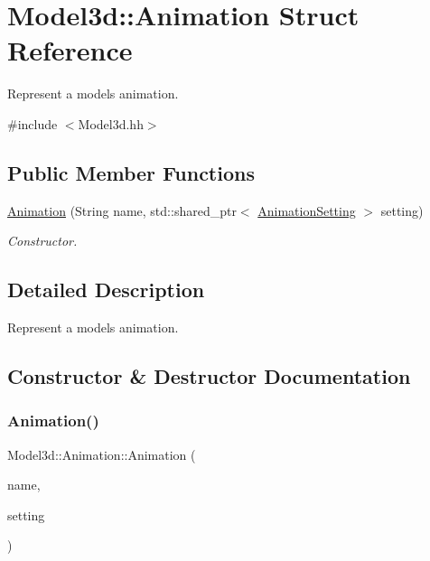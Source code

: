 \hypertarget{structModel3d_1_1Animation}{}\section{Model3d\+:\+:Animation Struct Reference}
\label{structModel3d_1_1Animation}


Represent a model\textquotesingle{}s animation.  




{\ttfamily \#include $<$Model3d.\+hh$>$}

\subsection*{Public Member Functions}
\begin{DoxyCompactItemize}
\item 
\hyperlink{structModel3d_1_1Animation_a55f708c4d35f050b9275f76395d0e2d2}{Animation} (String name, std\+::shared\+\_\+ptr$<$ \hyperlink{structModel3d_1_1AnimationSetting}{Animation\+Setting} $>$ setting)
\begin{DoxyCompactList}\small\item\em Constructor. \end{DoxyCompactList}\end{DoxyCompactItemize}


\subsection{Detailed Description}
Represent a model\textquotesingle{}s animation. 

\subsection{Constructor \& Destructor Documentation}
\mbox{\label{structModel3d_1_1Animation_a55f708c4d35f050b9275f76395d0e2d2}} 
\subsubsection{\texorpdfstring{Animation()}{Animation()}}
{\footnotesize\ttfamily Model3d\+::\+Animation\+::\+Animation (\begin{DoxyParamCaption}\item[{String}]{name,  }\item[{std\+::shared\+\_\+ptr$<$ \hyperlink{structModel3d_1_1AnimationSetting}{Animation\+Setting} $>$}]{setting }\end{DoxyParamCaption})}



